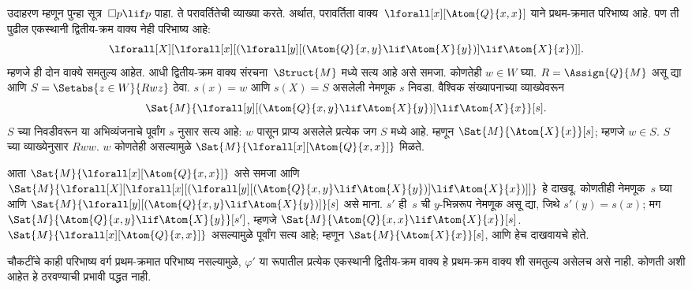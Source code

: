 उदाहरण म्हणून पुन्हा सूत्र~$\Box p \lif p$
पाहा. ते परावर्तितेची व्याख्या करते. अर्थात,
परावर्तिता वाक्य~$\lforall[x][\Atom{Q}{x,x}]$
याने प्रथम-क्रमात परिभाष्य आहे. पण ती पुढील
एकस्थानी द्वितीय-क्रम वाक्य नेही
परिभाष्य आहे:
\[\lforall[X][\lforall[x][(\lforall[y][(\Atom{Q}{x,y} \lif \Atom{X}{y})]
    \lif \Atom{X}{x})]].
\]
म्हणजे ही दोन वाक्ये समतुल्य आहेत. आधी द्वितीय-क्रम वाक्य
संरचना~$\Struct{M}$ मध्ये सत्य आहे असे समजा.
कोणतेही $w \in W$ घ्या. $R=\Assign{Q}{M}$ असू द्या आणि
$S=\Setabs{z \in W}{Rwz}$ ठेवा. $s(x)=w$ आणि $s(X)=S$
असलेली नेमणूक $s$ निवडा. वैश्विक संख्यापनाच्या व्याख्येवरून
\[\Sat{M}{\lforall[y][(\Atom{Q}{x,y} \lif \Atom{X}{y})]
    \lif \Atom{X}{x}}[s].
\]
$S$ च्या निवडीवरून या अभिव्यंजनाचे पूर्वांग $s$ नुसार सत्य आहे:
$w$ पासून प्राप्य असलेले प्रत्येक जग $S$ मध्ये आहे.
म्हणून $\Sat{M}{\Atom{X}{x}}[s]$; म्हणजे $w \in S$.
$S$ च्या व्याख्येनुसार $Rww$. $w$ कोणतेही असल्यामुळे
$\Sat{M}{\lforall[x][\Atom{Q}{x,x}]}$ मिळते.

आता $\Sat{M}{\lforall[x][\Atom{Q}{x,x}]}$
असे समजा आणि
$\Sat{M}{\lforall[X][\lforall[x][(\lforall[y][(\Atom{Q}{x,y} \lif
        \Atom{X}{y})] \lif \Atom{X}{x})]]}$
हे दाखवू. कोणतीही नेमणूक~$s$ घ्या आणि
$\Sat{M}{\lforall[y][(\Atom{Q}{x,y} \lif
    \Atom{X}{y})]}[s]$ असे माना. $s'$ ही~$s$
ची $y$-भिन्नरूप नेमणूक असू द्या, जिथे $s'(y)
= s(x)$; मग
$\Sat{M}{\Atom{Q}{x,y} \lif \Atom{X}{y}}[s']$,
म्हणजे $\Sat{M}{\Atom{Q}{x,x} \lif \Atom{X}{x}}[s]$.
$\Sat{M}{\lforall[x][\Atom{Q}{x,x}]}$ असल्यामुळे
पूर्वांग सत्य आहे; म्हणून $\Sat{M}{\Atom{X}{x}}[s]$,
आणि हेच दाखवायचे होते.

चौकटींचे काही परिभाष्य वर्ग प्रथम-क्रमात परिभाष्य
नसल्यामुळे, $\varphi'$ या रूपातील प्रत्येक एकस्थानी
द्वितीय-क्रम वाक्य हे प्रथम-क्रम
वाक्य शी समतुल्य असेलच असे नाही.
कोणती अशी आहेत हे ठरवण्याची प्रभावी पद्धत नाही.



